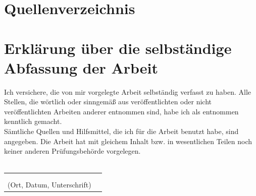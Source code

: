 \documentclass[a4paper,12pt,oneside]{article}
\begin{document}
  \section{Quellenverzeichnis}
    \printbibliography
  \newpage
  \pagestyle{empty}
  \section*{Erklärung über die selbständige Abfassung der Arbeit}
    Ich versichere, die von mir vorgelegte Arbeit selbständig verfasst zu haben.
    Alle Stellen, die wörtlich oder sinngemäß aus veröffentlichten oder nicht veröffentlichten Arbeiten anderer entnommen sind,
    habe ich als entnommen kenntlich gemacht.\\ 
    Sämtliche Quellen und Hilfsmittel, die ich für die Arbeit benutzt habe, sind
    angegeben. Die Arbeit hat mit gleichem Inhalt bzw. in wesentlichen Teilen noch keiner anderen Prüfungsbehörde vorgelegen.\\\\
    \begin{tabular}{cp{7cm}}
      & \\ 
      & \\ \hline
      \small (Ort, Datum, Unterschrift) & \normalsize \\
    \end{tabular}
  \newpage
  \thispagestyle{empty}
  
\end{document}
